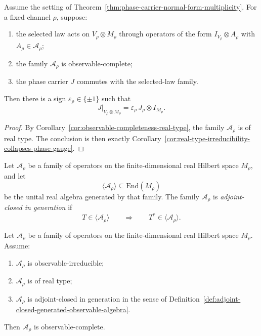 \begin{corollary}
\label{cor:observable-completeness-collapses-phase-gauge}
Assume the setting of
Theorem~\ref{thm:phase-carrier-normal-form-multiplicity}. For a fixed channel
$\rho$, suppose:
\begin{enumerate}[label=(\roman*), leftmargin=2em, itemsep=0.2em]
\item the selected law acts on $V_{\rho}\otimes M_{\rho}$ through operators of
      the form $I_{V_{\rho}}\otimes A_{\rho}$ with
      $A_{\rho}\in\mathcal A_{\rho}$;
\item the family $\mathcal A_{\rho}$ is observable-complete;
\item the phase carrier $J$ commutes with the selected-law family.
\end{enumerate}
Then there is a sign $\varepsilon_{\rho}\in\{\pm1\}$ such that
\[
J|_{V_{\rho}\otimes M_{\rho}}
=
\varepsilon_{\rho}\,J_{\rho}\otimes I_{M_{\rho}}.
\]
\end{corollary}

\begin{proof}
By Corollary~\ref{cor:observable-completeness-real-type}, the family
$\mathcal A_{\rho}$ is of real type. The conclusion is then exactly
Corollary~\ref{cor:real-type-irreducibility-collapses-phase-gauge}.
\end{proof}

\begin{definition}
\label{def:adjoint-closed-generated-observable-algebra}
Let $\mathcal A_{\rho}$ be a family of operators on the finite-dimensional
real Hilbert space $M_{\rho}$, and let
\[
\langle\mathcal A_{\rho}\rangle
\subseteq
\mathrm{End}(M_{\rho})
\]
be the unital real algebra generated by that family. The family
$\mathcal A_{\rho}$ is \emph{adjoint-closed in generation} if
\[
T\in\langle\mathcal A_{\rho}\rangle
\qquad\Longrightarrow\qquad
T^*\in\langle\mathcal A_{\rho}\rangle.
\]
\end{definition}

\begin{theorem}
\label{thm:adjoint-closed-real-type-complete}
Let $\mathcal A_{\rho}$ be a family of operators on the finite-dimensional
real Hilbert space $M_{\rho}$. Assume:
\begin{enumerate}[label=(\roman*), leftmargin=2em, itemsep=0.2em]
\item $\mathcal A_{\rho}$ is observable-irreducible;
\item $\mathcal A_{\rho}$ is of real type;
\item $\mathcal A_{\rho}$ is adjoint-closed in generation in the sense of
      Definition~\ref{def:adjoint-closed-generated-observable-algebra}.
\end{enumerate}
Then $\mathcal A_{\rho}$ is observable-complete.
\end{theorem}

